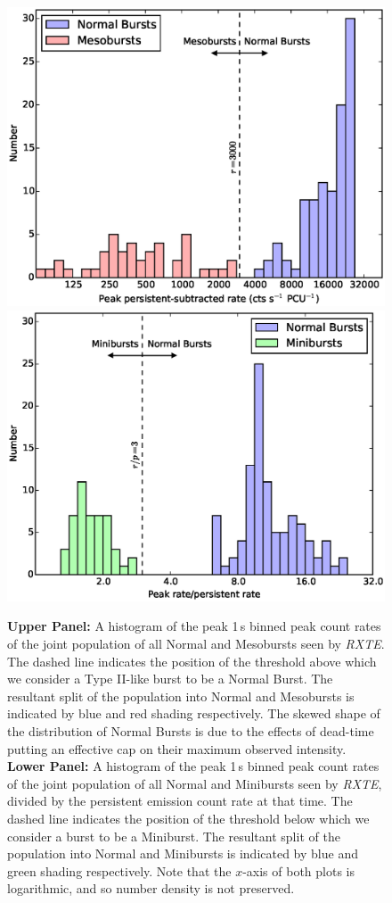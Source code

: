 \begin{figure}
  \centering
  \includegraphics[width=.9\linewidth, trim={1.3cm 0cm 2.0cm 0cm},clip]{images/norm_meso_sep.eps}
  \includegraphics[width=.9\linewidth, trim={1.3cm 0cm 2.0cm 0cm},clip]{images/norm_mini_sep.eps}
  \caption[Histogram of the peak 1\,s binned peak count rates during Normal Bursts, Mesobursts and Minibursts as seen by \textit{RXTE}]{\small \textbf{Upper Panel:} A histogram of the peak 1\,s binned peak count rates of the joint population of all Normal and Mesobursts seen by \textit{RXTE}.  The dashed line indicates the position of the threshold above which we consider a Type II-like burst to be a Normal Burst.  The resultant split of the population into Normal and Mesobursts is indicated by blue and red shading respectively.  The skewed shape of the distribution of Normal Bursts is due to the effects of dead-time putting an effective cap on their maximum observed intensity.
 \textbf{Lower Panel:} A histogram of the peak 1\,s binned peak count rates of the joint population of all Normal and Minibursts seen by \textit{RXTE}, divided by the persistent emission count rate at that time.  The dashed line indicates the position of the threshold below which we consider a burst to be a Miniburst.  The resultant split of the population into Normal and Minibursts is indicated by blue and green shading respectively.
  Note that the $x$-axis of both plots is logarithmic, and so number density is not preserved.}
  \label{fig:jointhist}
\end{figure}

